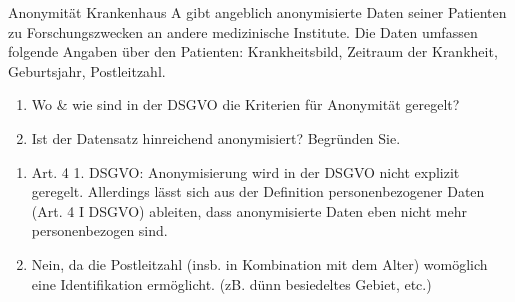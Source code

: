 \documentclass{article}
\begin{document}
\begin{exercise}{Anonymität}
  Krankenhaus A gibt angeblich anonymisierte Daten seiner Patienten zu Forschungszwecken an andere medizinische Institute. Die Daten umfassen folgende Angaben über den Patienten: Krankheitsbild, Zeitraum der Krankheit, Geburtsjahr, Postleitzahl.
  \begin{enumerate}
    \item Wo \& wie sind in der DSGVO die Kriterien für Anonymität geregelt?
    \item Ist der Datensatz hinreichend anonymisiert? Begründen Sie.
  \end{enumerate}

  \begin{solution}
    \begin{enumerate}
      \item Art. 4 1. DSGVO: Anonymisierung wird in der DSGVO nicht explizit geregelt. Allerdings lässt sich aus der Definition personenbezogener Daten (Art. 4 I DSGVO) ableiten, dass anonymisierte Daten eben nicht mehr personenbezogen sind.
      \item Nein, da die Postleitzahl (insb. in Kombination mit dem Alter) womöglich eine Identifikation ermöglicht. (zB. dünn besiedeltes Gebiet, etc.)
    \end{enumerate}
  \end{solution}
\end{exercise}
\end{document}
